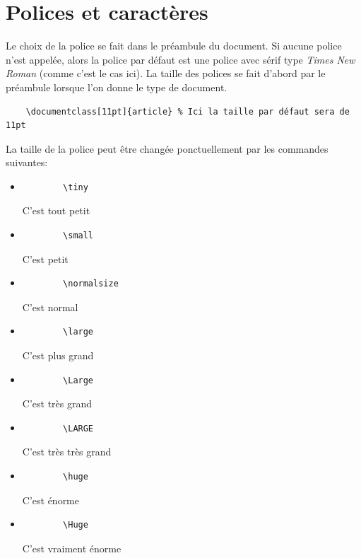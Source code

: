 \documentclass[11pt,a4paper]{article}
\begin{document}
\tableofcontents
	
\section{Polices et caractères}
	Le choix de la police se fait dans le préambule du document. Si aucune police n'est appelée, alors la police par défaut est une police avec sérif type \textit{Times New Roman} (comme c'est le cas ici). La taille des polices se fait d'abord par le préambule lorsque l'on donne le type de document. 
	
	\begin{verbatim}
	\documentclass[11pt]{article} % Ici la taille par défaut sera de 11pt
	\end{verbatim}
	
	La taille de la police peut être changée ponctuellement par les commandes suivantes:
	\begin{itemize}
		\item \begin{verbatim}
		\tiny
		\end{verbatim}
		{\tiny C'est tout petit}
		
		\item \begin{verbatim}
		\small
		\end{verbatim}
		{\small C'est petit}
		
		\item \begin{verbatim}
		\normalsize
		\end{verbatim}
		{\normalsize C'est normal}
		
		\item \begin{verbatim}
		\large
		\end{verbatim}
		{\large C'est plus grand}
		
		\item \begin{verbatim}
		\Large
		\end{verbatim}
		{\Large C'est très grand}
		
		\item \begin{verbatim}
		\LARGE
		\end{verbatim}
		{\LARGE C'est très très grand}
		
		\item \begin{verbatim}
		\huge
		\end{verbatim}
		{\huge C'est énorme}
		
		\item \begin{verbatim}
		\Huge
		\end{verbatim}
		{\Huge C'est vraiment énorme}
		\newline
	\end{itemize}
\end{document}
